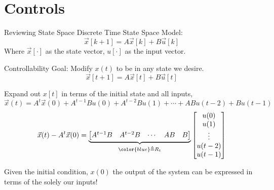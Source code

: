 \section{Controls}

\begin{frame}{Reviewing State Space}
    Discrete Time State Space Model:
    \[
        \vec x[k+1] = A \vec x[k] + B \vec u[k]
    \]
    Where \(\vec x[\cdot]\) as the state vector, \(u[\cdot]\) as the input vector.
\end{frame}


\begin{frame}{Controllability}
    Goal: Modify \(x(t)\) to be in any state we desire.
    \[
        \vec x[t+1] = A \vec x[t] + B \vec u[t]
    \]

    Expand out \(x[t]\) in terms of the initial state and all inputs,
    \[
        \vec x(t) = A^t \vec x(0)
                + A^{t - 1} B u(0)
                + A^{t - 2} B u(1)  + \cdots
                + A B u(t - 2)
                + B u(t - 1)
    \]
    \[
        \vec x(t) - A^t \vec x(0) =
        \underbrace{\begin{bmatrix}
            A^{t - 1} B & A^{t -2} B & \cdots & AB & B
        \end{bmatrix}}_{\color{blue}\triangleq R_t}
        \begin{bmatrix}
            u(0) \\
            u(1) \\
            \vdots \\
            u(t -2) \\
            u(t -1) \\
        \end{bmatrix}
    \]

    \pause
    Given the initial condition, \(x(0)\) the output of the system can be  expressed in terms of the solely our inputs!
\end{frame}

